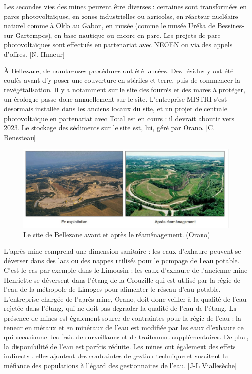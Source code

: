 \documentclass{article}
\begin{document}
Les secondes vies des mines peuvent être diverses : certaines sont transformées en parcs photovoltaïques, en zones industrielles ou agricoles, en réacteur nucléaire naturel comme à Oklo au Gabon, en musée (comme le musée Uréka de Bessines-sur-Gartempes), en base nautique ou encore en parc. Les projets de parc photovoltaïques sont effectués en partenariat avec NEOEN ou via des appels d’offres. [N. Himeur]

À Bellezane, de nombreuses procédures ont été lancées. Des résidus y ont été coulés avant d’y poser une couverture en stériles et terre, puis de commencer la revégétalisation. Il y a notamment sur le site des fourrés et des mares à protéger, un écologue passe donc annuellement sur le site. L’entreprise MISTRI s’est désormais installée dans les anciens locaux du site, et un projet de centrale photovoltaïque en partenariat avec Total est en cours : il devrait aboutir vers 2023. Le stockage des sédiments sur le site est, lui, géré par Orano. [C. Benesteau]

\begin{figure}[!hbt]
    \centering
    \includegraphics[width=\linewidth]{I_B_2.jpg}
    \caption{Le site de Bellezane avant et après le réaménagement. (Orano)}
    \label{fig:bellezane_avant_apres}
\end{figure}

L’après-mine comprend une dimension sanitaire : les eaux d’exhaure peuvent se déverser dans des lacs ou des nappes utilisés pour le pompage de l’eau potable. C’est le cas par exemple dans le Limousin : les eaux d’exhaure de l’ancienne mine Henriette se déversent dans l’étang de la Crouzille qui est utilisé par la régie de l’eau de la métropole de Limoges pour alimenter le réseau d’eau potable. L’entreprise chargée de l’après-mine, Orano, doit donc veiller à la qualité de l’eau rejetée dans l’étang, qui ne doit pas dégrader la qualité de l’eau de l’étang. La présence de mines est également source de contraintes pour la régie de l’eau : la teneur en métaux et en minéraux de l’eau est modifiée par les eaux d’exhaure ce qui occasionne des frais de surveillance et de traitement supplémentaires. De plus, la disponibilité de l’eau est parfois réduite. Les mines ont également des effets indirects : elles ajoutent des contraintes de gestion technique et suscitent la méfiance des populations à l’égard des gestionnaires de l’eau. [J-L Viallesèche]
\end{document}

